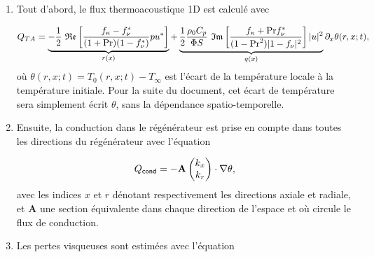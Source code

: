 \begin{enumerate}[label=\textbf{(\roman*)}]
\item Tout d'abord, le flux thermoacoustique 1D est calculé avec

\begin{equation}
Q_{TA} = \underbrace{ -\frac12~\mathfrak{Re}\left[ \frac{ f_\kappa-f_\nu^* }{ (1+\mathrm{Pr})(1-f_\nu^*) } pu^* \right] }_{r(x)} + \underbrace{ \frac12 \frac{\rho_0 C_p}{\Phi S}~\mathfrak{Im}\left[ \frac{f_\kappa + \mathrm{Pr} f_\nu^*}{(1-\mathrm{Pr}^2)|1-f_\nu|^2} \right] |u|^2 }_{q(x)}\partial_x \theta(r,x;t),
\label{eq:FluxTA_Lotton_Regen}
\end{equation}
où $\theta(r,x;t) = T_0(r,x;t)-T_\infty$ est l'écart de la température locale à la température initiale. Pour la suite du document, cet écart de température sera simplement écrit $\theta$, sans la dépendance spatio-temporelle. 

\item Ensuite, la conduction dans le régénérateur est prise en compte dans toutes les directions du régénérateur avec l'équation

\begin{equation}
	Q_{\sf cond} = -\mathbf A \begin{pmatrix}
	k_x\\
	k_r
	\end{pmatrix} \cdot \nabla \theta,
	\label{eq:FluxCond_Lotton}
\end{equation}
avec les indices $x$ et $r$ dénotant respectivement les directions axiale et radiale, et $\mathbf A$ une section équivalente dans chaque direction de l'espace et où circule le flux de conduction.

%
%

\item Les pertes visqueuses sont estimées avec l'équation


\end{enumerate}

